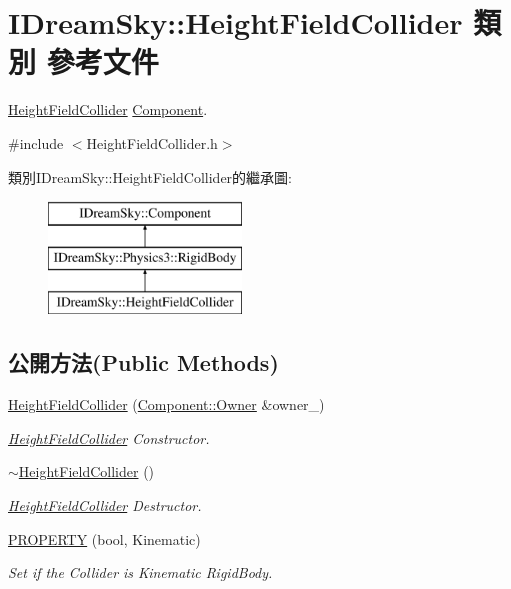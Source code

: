 \hypertarget{class_i_dream_sky_1_1_height_field_collider}{}\section{I\+Dream\+Sky\+:\+:Height\+Field\+Collider 類別 參考文件}
\label{class_i_dream_sky_1_1_height_field_collider}


\hyperlink{class_i_dream_sky_1_1_height_field_collider}{Height\+Field\+Collider} \hyperlink{class_i_dream_sky_1_1_component}{Component}.  




{\ttfamily \#include $<$Height\+Field\+Collider.\+h$>$}

類別\+I\+Dream\+Sky\+:\+:Height\+Field\+Collider的繼承圖\+:\begin{figure}[H]
\begin{center}
\leavevmode
\includegraphics[height=3.000000cm]{class_i_dream_sky_1_1_height_field_collider}
\end{center}
\end{figure}
\subsection*{公開方法(Public Methods)}
\begin{DoxyCompactItemize}
\item 
\hyperlink{class_i_dream_sky_1_1_height_field_collider_a99b69bdb09f89bbf80008cd6e9387dc8}{Height\+Field\+Collider} (\hyperlink{class_i_dream_sky_1_1_component_1_1_owner}{Component\+::\+Owner} \&owner\+\_\+)
\begin{DoxyCompactList}\small\item\em \hyperlink{class_i_dream_sky_1_1_height_field_collider}{Height\+Field\+Collider} Constructor. \end{DoxyCompactList}\item 
\hyperlink{class_i_dream_sky_1_1_height_field_collider_acd0e4168c3ac63f938ab24bc0f93aa3e}{$\sim$\+Height\+Field\+Collider} ()
\begin{DoxyCompactList}\small\item\em \hyperlink{class_i_dream_sky_1_1_height_field_collider}{Height\+Field\+Collider} Destructor. \end{DoxyCompactList}\item 
\hyperlink{class_i_dream_sky_1_1_height_field_collider_a67774950668776d15845cb08985c88c0}{P\+R\+O\+P\+E\+R\+TY} (bool, Kinematic)
\begin{DoxyCompactList}\small\item\em Set if the Collider is Kinematic Rigid\+Body. \end{DoxyCompactList}\end{DoxyCompactItemize}
